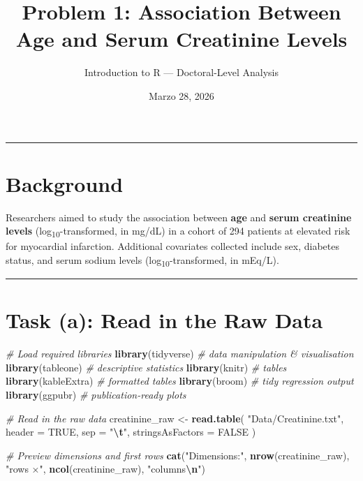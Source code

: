 \documentclass[
  12pt,
]{article}
\title{Problem 1: Association Between Age and Serum Creatinine Levels}
\subtitle{Introduction to R --- Doctoral-Level Analysis}
\author{}
\date{\vspace{-2.5em}Marzo 28, 2026}
\newenvironment{Shaded}{\begin{snugshade}}{\end{snugshade}}
\newcommand{\AttributeTok}[1]{\textcolor[rgb]{0.13,0.29,0.53}{#1}}
\newcommand{\CommentTok}[1]{\textcolor[rgb]{0.56,0.35,0.01}{\textit{#1}}}
\newcommand{\ConstantTok}[1]{\textcolor[rgb]{0.56,0.35,0.01}{#1}}
\newcommand{\FunctionTok}[1]{\textcolor[rgb]{0.13,0.29,0.53}{\textbf{#1}}}
\newcommand{\NormalTok}[1]{#1}
\newcommand{\OtherTok}[1]{\textcolor[rgb]{0.56,0.35,0.01}{#1}}
\newcommand{\SpecialCharTok}[1]{\textcolor[rgb]{0.81,0.36,0.00}{\textbf{#1}}}
\newcommand{\StringTok}[1]{\textcolor[rgb]{0.31,0.60,0.02}{#1}}
\begin{document}
\maketitle

{
\setcounter{tocdepth}{3}
\tableofcontents
}
\begin{center}\rule{0.5\linewidth}{0.5pt}\end{center}

\hypertarget{background}{%
\section{Background}\label{background}}

Researchers aimed to study the association between \textbf{age} and
\textbf{serum creatinine levels} (log\textsubscript{10}-transformed, in
mg/dL) in a cohort of 294 patients at elevated risk for myocardial
infarction. Additional covariates collected include sex, diabetes
status, and serum sodium levels (log\textsubscript{10}-transformed, in
mEq/L).

\begin{center}\rule{0.5\linewidth}{0.5pt}\end{center}

\hypertarget{task-a-read-in-the-raw-data}{%
\section{Task (a): Read in the Raw
Data}\label{task-a-read-in-the-raw-data}}

\begin{Shaded}
\begin{Highlighting}[]
\CommentTok{\# Load required libraries}
\FunctionTok{library}\NormalTok{(tidyverse)    }\CommentTok{\# data manipulation \& visualisation}
\FunctionTok{library}\NormalTok{(tableone)     }\CommentTok{\# descriptive statistics}
\FunctionTok{library}\NormalTok{(knitr)        }\CommentTok{\# tables}
\FunctionTok{library}\NormalTok{(kableExtra)   }\CommentTok{\# formatted tables}
\FunctionTok{library}\NormalTok{(broom)        }\CommentTok{\# tidy regression output}
\FunctionTok{library}\NormalTok{(ggpubr)       }\CommentTok{\# publication{-}ready plots}

\CommentTok{\# Read in the raw data}
\NormalTok{creatinine\_raw }\OtherTok{\textless{}{-}} \FunctionTok{read.table}\NormalTok{(}
  \StringTok{"Data/Creatinine.txt"}\NormalTok{,}
  \AttributeTok{header      =} \ConstantTok{TRUE}\NormalTok{,}
  \AttributeTok{sep         =} \StringTok{"}\SpecialCharTok{\textbackslash{}t}\StringTok{"}\NormalTok{,}
  \AttributeTok{stringsAsFactors =} \ConstantTok{FALSE}
\NormalTok{)}

\CommentTok{\# Preview dimensions and first rows}
\FunctionTok{cat}\NormalTok{(}\StringTok{"Dimensions:"}\NormalTok{, }\FunctionTok{nrow}\NormalTok{(creatinine\_raw), }\StringTok{"rows ×"}\NormalTok{, }\FunctionTok{ncol}\NormalTok{(creatinine\_raw), }\StringTok{"columns}\SpecialCharTok{\textbackslash{}n}\StringTok{"}\NormalTok{)}
\end{Highlighting}
\end{Shaded}
\end{document}
